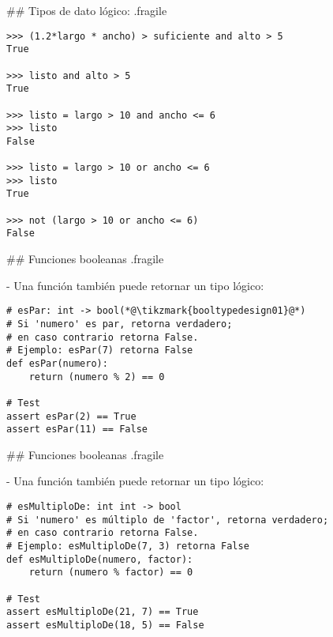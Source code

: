 \trmcolumns


## Tipos de dato lógico: {.fragile}


\begin{lstlisting}
>>> (1.2*largo * ancho) > suficiente and alto > 5
True

>>> listo and alto > 5
True

>>> listo = largo > 10 and ancho <= 6
>>> listo
False

>>> listo = largo > 10 or ancho <= 6
>>> listo
True

>>> not (largo > 10 or ancho <= 6)
False
\end{lstlisting}

## Funciones booleanas {.fragile}

- Una función también puede retornar un tipo lógico:

\begin{lstlisting}[style=frame02]
# esPar: int -> bool(*@\tikzmark{booltypedesign01}@*)
# Si 'numero' es par, retorna verdadero;
# en caso contrario retorna False.
# Ejemplo: esPar(7) retorna False
def esPar(numero):
    return (numero % 2) == 0

# Test
assert esPar(2) == True
assert esPar(11) == False
\end{lstlisting}

\pause


## Funciones booleanas {.fragile}

- Una función también puede retornar un tipo lógico:

\begin{lstlisting}[style=frame02]
# esMultiploDe: int int -> bool
# Si 'numero' es múltiplo de 'factor', retorna verdadero;
# en caso contrario retorna False.
# Ejemplo: esMultiploDe(7, 3) retorna False
def esMultiploDe(numero, factor):
    return (numero % factor) == 0

# Test
assert esMultiploDe(21, 7) == True
assert esMultiploDe(18, 5) == False
\end{lstlisting}

